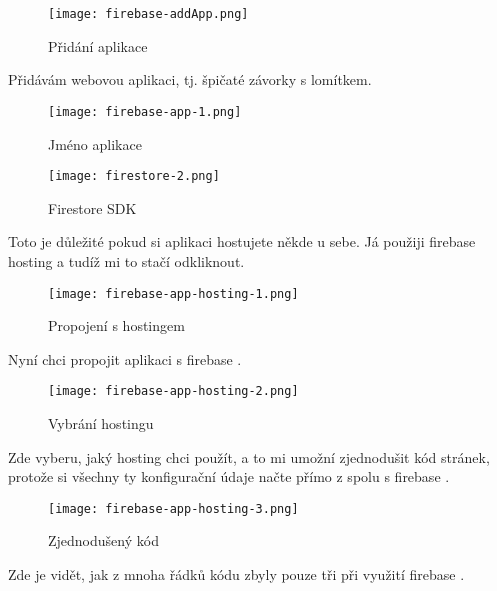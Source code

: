 \begin{figure}[H]
    \centering
    \texttt{[image: firebase-addApp.png]}
    \caption{Přidání aplikace}
\end{figure}
Přidávám webovou aplikaci, tj. špičaté závorky s lomítkem.
\begin{figure}[H]
    \centering
    \texttt{[image: firebase-app-1.png]}
    \caption{Jméno aplikace}
\end{figure}
\begin{figure}[H]
    \centering
    \texttt{[image: firestore-2.png]}
    \caption{Firestore SDK}
\end{figure}
Toto je důležité pokud si aplikaci hostujete někde u sebe. Já použiji \gls{firebase} \gls{hosting} a tudíž mi to stačí 
odkliknout.
\begin{figure}[H]
    \centering
    \texttt{[image: firebase-app-hosting-1.png]}
    \caption{Propojení s hostingem}
\end{figure}
Nyní chci propojit aplikaci s firebase .
\begin{figure}[H]
    \centering
    \texttt{[image: firebase-app-hosting-2.png]}
    \caption{Vybrání hostingu}
\end{figure}
Zde vyberu, jaký \gls{hosting} chci použít, a to mi umožní zjednodušit kód stránek, protože si všechny ty konfigurační 
údaje načte přímo z  spolu s \gls{firebase} .
\begin{figure}[H]
    \centering
    \texttt{[image: firebase-app-hosting-3.png]}
    \caption{Zjednodušený kód}
\end{figure}
Zde je vidět, jak z mnoha řádků kódu zbyly pouze tři při využití \gls{firebase} .
